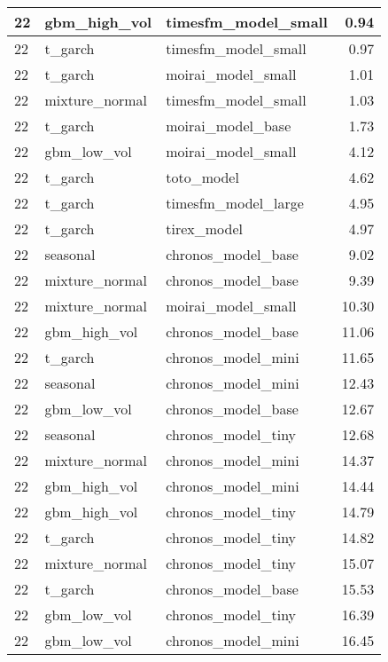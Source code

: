 {\begin{tabular}{lllr}
\midrule
22 & gbm\_high\_vol & timesfm\_model\_small & 0.94 \\
\midrule
22 & t\_garch & timesfm\_model\_small & 0.97 \\
\midrule
22 & t\_garch & moirai\_model\_small & 1.01 \\
\midrule
22 & mixture\_normal & timesfm\_model\_small & 1.03 \\
\midrule
22 & t\_garch & moirai\_model\_base & 1.73 \\
\midrule
22 & gbm\_low\_vol & moirai\_model\_small & 4.12 \\
\midrule
22 & t\_garch & toto\_model & 4.62 \\
\midrule
22 & t\_garch & timesfm\_model\_large & 4.95 \\
\midrule
22 & t\_garch & tirex\_model & 4.97 \\
\midrule
22 & seasonal & chronos\_model\_base & 9.02 \\
\midrule
22 & mixture\_normal & chronos\_model\_base & 9.39 \\
\midrule
22 & mixture\_normal & moirai\_model\_small & 10.30 \\
\midrule
22 & gbm\_high\_vol & chronos\_model\_base & 11.06 \\
\midrule
22 & t\_garch & chronos\_model\_mini & 11.65 \\
\midrule
22 & seasonal & chronos\_model\_mini & 12.43 \\
\midrule
22 & gbm\_low\_vol & chronos\_model\_base & 12.67 \\
\midrule
22 & seasonal & chronos\_model\_tiny & 12.68 \\
\midrule
22 & mixture\_normal & chronos\_model\_mini & 14.37 \\
\midrule
22 & gbm\_high\_vol & chronos\_model\_mini & 14.44 \\
\midrule
22 & gbm\_high\_vol & chronos\_model\_tiny & 14.79 \\
\midrule
22 & t\_garch & chronos\_model\_tiny & 14.82 \\
\midrule
22 & mixture\_normal & chronos\_model\_tiny & 15.07 \\
\midrule
22 & t\_garch & chronos\_model\_base & 15.53 \\
\midrule
22 & gbm\_low\_vol & chronos\_model\_tiny & 16.39 \\
\midrule
22 & gbm\_low\_vol & chronos\_model\_mini & 16.45 \\
\bottomrule
\end{tabular}
}